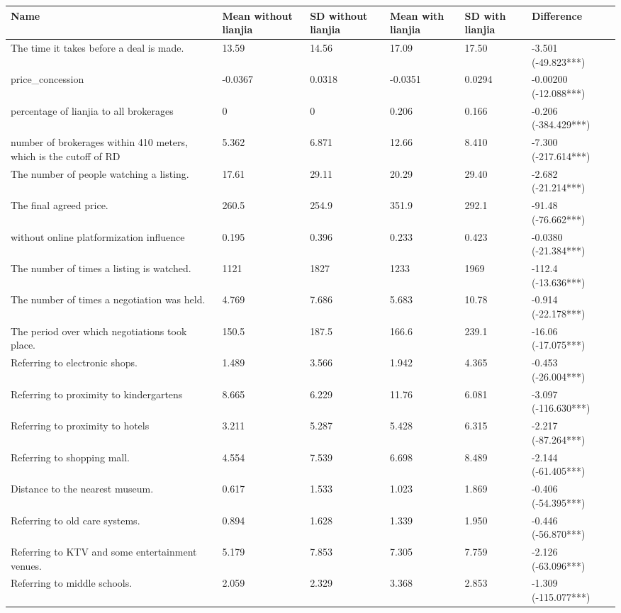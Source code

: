 \begin{tabular}{p{5cm}lllll}
\toprule
Name & Mean without lianjia & SD without lianjia & Mean with lianjia & SD with lianjia & Difference \\
\midrule
The time it takes before a deal is made. & 13.59 & 14.56 & 17.09 & 17.50 & -3.501 (-49.823***) \\
price\_concession & -0.0367 & 0.0318 & -0.0351 & 0.0294 & -0.00200 (-12.088***) \\
percentage of lianjia to all brokerages & 0 & 0 & 0.206 & 0.166 & -0.206 (-384.429***) \\
number of brokerages within 410 meters, which is the cutoff of RD & 5.362 & 6.871 & 12.66 & 8.410 & -7.300 (-217.614***) \\
The number of people watching a listing. & 17.61 & 29.11 & 20.29 & 29.40 & -2.682 (-21.214***) \\
The final agreed price. & 260.5 & 254.9 & 351.9 & 292.1 & -91.48 (-76.662***) \\
without online platformization influence & 0.195 & 0.396 & 0.233 & 0.423 & -0.0380 (-21.384***) \\
The number of times a listing is watched. & 1121 & 1827 & 1233 & 1969 & -112.4 (-13.636***) \\
The number of times a negotiation was held. & 4.769 & 7.686 & 5.683 & 10.78 & -0.914 (-22.178***) \\
The period over which negotiations took place. & 150.5 & 187.5 & 166.6 & 239.1 & -16.06 (-17.075***) \\
Referring to electronic shops. & 1.489 & 3.566 & 1.942 & 4.365 & -0.453 (-26.004***) \\
Referring to proximity to kindergartens & 8.665 & 6.229 & 11.76 & 6.081 & -3.097 (-116.630***) \\
Referring to proximity to hotels & 3.211 & 5.287 & 5.428 & 6.315 & -2.217 (-87.264***) \\
Referring to shopping mall. & 4.554 & 7.539 & 6.698 & 8.489 & -2.144 (-61.405***) \\
Distance to the nearest museum. & 0.617 & 1.533 & 1.023 & 1.869 & -0.406 (-54.395***) \\
Referring to old care systems. & 0.894 & 1.628 & 1.339 & 1.950 & -0.446 (-56.870***) \\
Referring to KTV and some entertainment venues. & 5.179 & 7.853 & 7.305 & 7.759 & -2.126 (-63.096***) \\
Referring to middle schools. & 2.059 & 2.329 & 3.368 & 2.853 & -1.309 (-115.077***) \\

\end{tabular}
